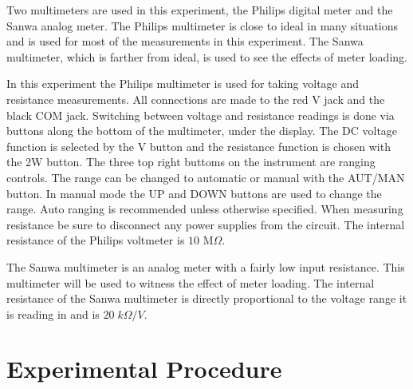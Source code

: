 \documentclass[12pt, a4paper, oneside, openright, titlepage]{book}
\begin{document}
\noindent Two multimeters are used in this experiment, the Philips digital meter and the Sanwa analog meter. The Philips multimeter is close to ideal in many situations and is used for most of the measurements in this experiment. The Sanwa multimeter, which is farther from ideal, is used to see the effects of meter loading.

\noindent In this experiment the Philips multimeter is used for taking voltage and resistance measurements. All connections are made to the red V jack and the black COM jack. Switching between voltage and resistance readings is done via buttons along the bottom of the multimeter, under the display. The DC voltage function is selected by the V button and the resistance function is chosen with the 2W button. The three top right buttoms on the instrument are ranging controls. The range can be changed to automatic or manual with the AUT/MAN button. In manual mode the UP and DOWN buttons are used to change the range. Auto ranging is recommended unless otherwise specified. When measuring resistance be sure to disconnect any power supplies from the circuit. The internal resistance of the Philips voltmeter is $10$ M$\Omega$.

\noindent The Sanwa multimeter is an analog meter with a fairly low input resistance. This multimeter will be used to witness the effect of meter loading. The internal resistance of the Sanwa multimeter is directly proportional to the voltage range it is reading in and is $20\;k\Omega/V$.


\section{Experimental Procedure}
\end{document}

